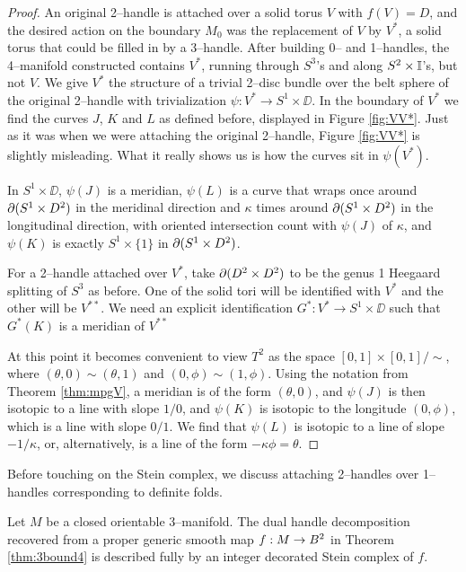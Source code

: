 \begin{proof}
	An original 2--handle is attached over a solid torus $V$ with $f(V)=D$, and the desired action on the boundary $M_0$ was the replacement of $V$ by $V^*$, a solid torus that could be filled in by a 3--handle.
	After building 0-- and 1--handles, the 4--manifold constructed contains $V^*$, running through $S^3$'s and along $S^2\times\mathbb{I}$'s, but not $V$.
	We give $V^*$ the structure of a trivial 2--disc bundle over the belt sphere of the original 2--handle with trivialization $\psi:V^*\to S^1\times\DD$.
	In the boundary of $V^*$ we find the curves $J$, $K$ and $L$ as defined before, displayed in Figure \ref{fig:VV*}.
	Just as it was when we were attaching the original 2--handle, Figure \ref{fig:VV*} is slightly misleading.
	What it really shows us is how the curves sit in $\psi(V^*)$.
	
	In $S^1\times\DD$, $\psi(J)$ is a meridian, $\psi(L)$ is a curve that wraps once around $\partial(S^1\times D^2)$ in the meridinal direction and $\kappa$ times around $\partial(S^1\times D^2)$ in the longitudinal direction, with oriented intersection count with $\psi(J)$ of $\kappa$, and $\psi(K)$ is exactly $S^1\times\{1\}$ in $\partial(S^1\times D^2)$.
	
	For a 2--handle attached over $V^*$, take $\partial (D^2\times D^2)$ to be the genus 1 Heegaard splitting of $S^3$ as before.
	One of the solid tori will be identified with $V^*$ and the other will be $V^{**}$.
	We need an explicit identification $G^*:V^*\to S^1\times\DD$ such that $G^*(K)$ is a meridian of $V^{**}$
	
	At this point it becomes convenient to view $T^2$ as the space $[0,1]\times[0,1]/\sim$, where $(\theta,0)\sim(\theta,1)$ and $(0,\phi)\sim(1,\phi)$.
	Using the notation from Theorem \ref{thm:mpgV}, a meridian is of the form $(\theta,0)$, and $\psi(J)$ is then isotopic to a line with slope $1/0$, and $\psi(K)$ is isotopic to the longitude $(0,\phi)$, which is a line with slope $0/1$.
	We find that $\psi(L)$ is isotopic to a line of slope $-1/\kappa$, or, alternatively, is a line of the form $-\kappa\phi=\theta$.
	
	
\end{proof}

\begin{rmk}
	\label{rmk:definitehandles}
	Before touching on the Stein complex, we discuss attaching 2--handles over 1--handles corresponding to definite folds.
\end{rmk}


\begin{theorem}
	\label{thm:3stein4}
	Let $M$ be a closed orientable 3--manifold.
	The dual handle decomposition recovered from a proper generic smooth map $f:M\to B^2$ in Theorem \ref{thm:3bound4} is described fully by an integer decorated Stein complex of $f$.
\end{theorem}


